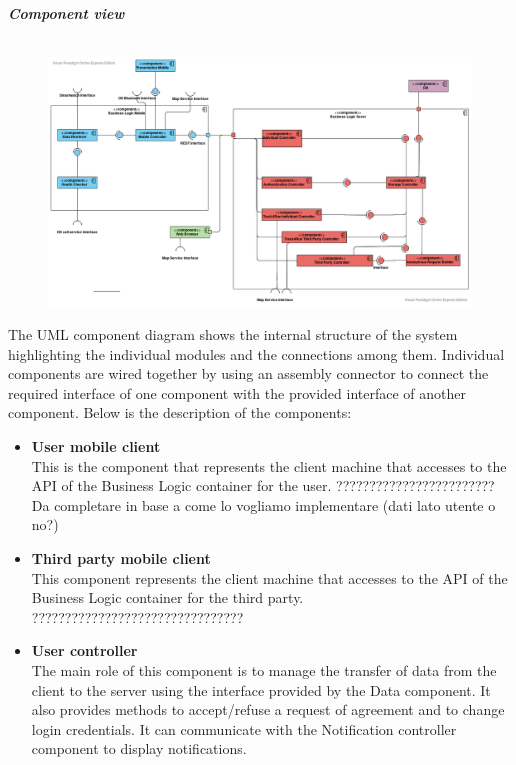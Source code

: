 \begin{legal}
		\item \textit{\textbf{Component view}}\\\\
		\begin{figure}[H]
		\includegraphics[width=\linewidth]{../images/design/ComponentDiagram.png}
		\end{figure}
		The UML component diagram shows the internal structure of the system highlighting the individual modules and the connections among them. Individual components are wired together by using an assembly connector to connect the required interface of one component with the provided interface of another component. Below is the description of the components:\\
		\begin{itemize}
		\item{\textbf{User mobile client}\\
		This is the component that represents the client machine that accesses to the API of the Business Logic container for the user. ???????????????????????? Da completare in base a come lo vogliamo implementare (dati lato utente o no?)
				}\\
		\item{\textbf{Third party mobile client}\\
		This component represents the client machine that accesses to the API of the Business Logic container for the third party. ????????????????????????????????
				}\\
		\item{\textbf{User controller}\\
		The main role of this component is to manage the transfer of data from the client to the server using the interface provided by the Data component. It also provides methods to accept/refuse a request of agreement and to change login credentials. It can communicate with the Notification controller component to display notifications.
}
\end{itemize}
\end{legal}
